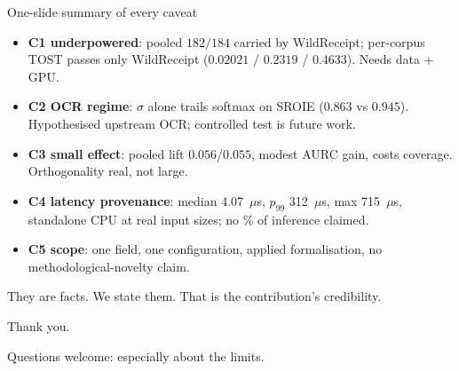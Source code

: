 \documentclass[aspectratio=169]{beamer}
\newcommand{\poolIntA}{184}
\newcommand{\poolIntC}{182}
\newcommand{\rgTostCordP}{0.2319}
\newcommand{\rgTostSroieP}{0.4633}
\newcommand{\rgTostWrP}{0.02021}
\newcommand{\orthDrand}{0.056}
\newcommand{\orthDcorr}{0.055}
\newcommand{\latMedian}{4.07}
\newcommand{\latPNineNine}{312}
\newcommand{\latMax}{715}
\newcommand{\latUnit}{\ensuremath{\mu}s}
\newcommand{\bigq}[1]{\begin{center}{\Large #1}\end{center}}
\newcommand{\keybox}[1]{\begin{center}\colorbox{grey!15}{\parbox{0.92\linewidth}{\centering #1}}\end{center}}
\begin{document}
\begin{frame}{One-slide summary of every caveat}
\begin{itemize}
\item \textbf{C1 underpowered}: pooled $\poolIntC/\poolIntA$ carried by
WildReceipt; per-corpus TOST passes only WildReceipt
($\rgTostWrP$ / $\rgTostCordP$ / $\rgTostSroieP$). Needs data + GPU.
\item \textbf{C2 OCR regime}: $\sigma$ alone trails softmax on SROIE
($0.863$ vs $0.945$). Hypothesised upstream OCR; controlled test is
future work.
\item \textbf{C3 small effect}: pooled lift $\orthDrand$/$\orthDcorr$,
modest AURC gain, costs coverage. Orthogonality real, not large.
\item \textbf{C4 latency provenance}: median \latMedian~\latUnit{},
$p_{99}$ \latPNineNine~\latUnit{}, max \latMax~\latUnit{}, standalone
CPU at real input sizes; no \% of inference claimed.
\item \textbf{C5 scope}: one field, one configuration, applied
formalisation, no methodological-novelty claim.
\end{itemize}
\keybox{They are facts. We state them. That is the contribution's
credibility.}
\end{frame}

\begin{frame}
\vfill
\bigq{Thank you.}
\vspace{0.6em}
\bigq{\normalsize Questions welcome: especially about the limits.}
\vfill
\end{frame}
\end{document}
